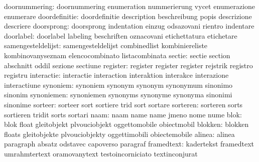             doornummering: doornummering             enumeration
                           nummerierung              vycet
                           enumerazione              enumerare
            doordefinitie: doordefinitie             description
                           beschreibung              popis
                           descrizione               descriere
               doorsprong: doorsprong                indentation
                           einzug                    odsazovani
                           rientro                   indentare
                doorlabel: doorlabel                 labeling
                           beschriften               oznacovani
                           etichettatura             etichetare
       samengesteldelijst: samengesteldelijst        combinedlist
                           kombiniereliste           kombinovanyseznam
                           elencocombinato           listacombinata
                   sectie: sectie                    section
                           abschnitt                 oddil
                           sezione                   sectiune
                 register: register                  register
                           register                  rejstrik
                           registro                  registru
               interactie: interactie                interaction
                           interaktion               interakce
                           interazione               interactiune
                 synoniem: synoniem                  synonym
                           synonym                   synonymum
                           sinonimo                  sinonim
               synoniemen: synoniemen                synonyms
                           synonyme                  synonyma
                           sinonimi                  sinonime
                  sorteer: sorteer                   sort
                           sortiere                  trid
                           sort                      sortare %
                 sorteren: sorteren                  sorts
                           sortieren                 tridit
                           sorts                     sortari %
                     naam: naam                      name
                           name                      jmeno
                           nome                      nume
                     blok: blok                      float
                           gleitobjekt               plvouciobjekt
                           oggettomobile             obiectmobil
                  blokken: blokken                   floats
                           gleitobjekte              plvouciobjekty
                           oggettimobili             obiectemobile
                   alinea: alinea                    paragraph
                           absatz                    odstavec
                           capoverso                 paragraf
               framedtext: kadertekst                framedtext
                           umrahmtertext             oramovanytext
                           testoincorniciato         textinconjurat

